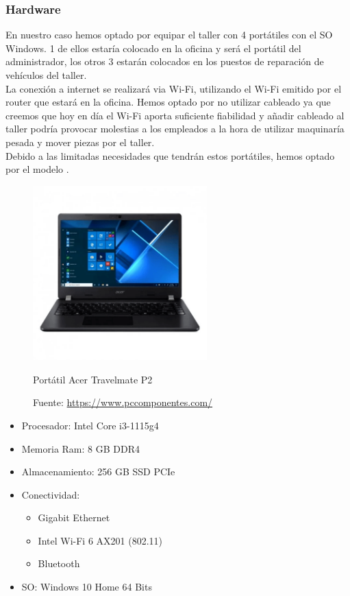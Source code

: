 \documentclass{article}
\begin{document}
\subsubsection{Hardware}
En nuestro caso hemos optado por equipar el taller con 4 portátiles con el SO Windows. 1 de ellos estaría colocado en la oficina y será el portátil del administrador, los otros 3 estarán colocados 
en los puestos de reparación de vehículos del taller.\\ La conexión a internet se realizará via Wi-Fi, utilizando el Wi-Fi emitido por el router que estará en la oficina. Hemos optado 
por no utilizar cableado ya que creemos que hoy en día el Wi-Fi aporta suficiente fiabilidad y añadir cableado al taller podría provocar molestias a los empleados a la hora de utilizar 
maquinaría pesada y mover piezas por el taller.\\
Debido a las limitadas necesidades que tendrán estos portátiles, hemos optado por el modelo \href{https://www.pccomponentes.com/acer-travelmate-p2-tmp214-53-37at-intel-core-i3-1115g4-8gb-256gb-ssd-14}{}.\\
\begin{figure}[H]
  \centering
  \includegraphics[width=0.6\textwidth]{CapturasSistemas/portatil.png}
  \caption{Portátil Acer Travelmate P2}
  \caption*{Fuente: \href{https://www.pccomponentes.com/acer-travelmate-p2-tmp214-53-37at-intel-core-i3-1115g4-8gb-256gb-ssd-14}{https://www.pccomponentes.com/}}
\end{figure}
\begin{itemize}
  \item Procesador: Intel Core i3-1115g4
  \item Memoria Ram: 8 GB DDR4
  \item Almacenamiento: 256 GB SSD PCIe
  \item Conectividad: \begin{itemize}
    \item Gigabit Ethernet
    \item Intel Wi-Fi 6 AX201 (802.11)
    \item Bluetooth
  \end{itemize}
  \item SO: Windows 10 Home 64 Bits
\end{itemize}
\end{document}
